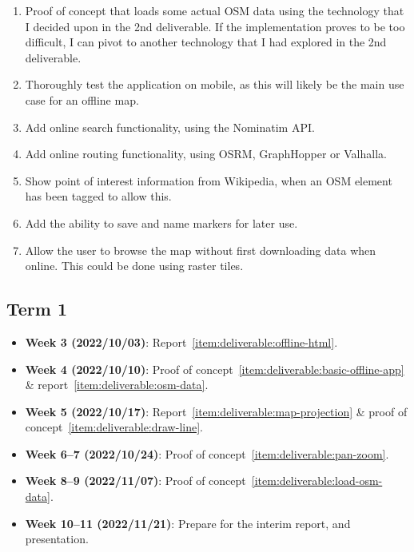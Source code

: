 \documentclass[]{final_report}
\begin{document}
\begin{enumerate}
    \item Proof of concept that loads some actual OSM data using the technology that I decided upon in the 2nd deliverable. If the implementation proves to be too difficult, I can pivot to another technology that I had explored in the 2nd deliverable.\label{item:deliverable:load-osm-data}
    \item Thoroughly test the application on mobile, as this will likely be the main use case for an offline map.\label{item:deliverable:mobile-testing}
    \item Add online search functionality, using the Nominatim API.\label{item:deliverable:search}
    \item Add online routing functionality, using OSRM, GraphHopper or Valhalla.\label{item:deliverable:routing}
    \item Show point of interest information from Wikipedia, when an OSM element has been tagged to allow this.\label{item:deliverable:wikipedia}
    \item Add the ability to save and name markers for later use.\label{item:deliverable:markers}
    \item Allow the user to browse the map without first downloading data when online. This could be done using raster tiles.\label{item:deliverable:online}
\end{enumerate}

\subsection{Term 1}

\begin{itemize}
    \item \textbf{Week 3 (2022/10/03)}: Report~\ref{item:deliverable:offline-html}.
    \item \textbf{Week 4 (2022/10/10)}: Proof of concept~\ref{item:deliverable:basic-offline-app} \& report~\ref{item:deliverable:osm-data}.
    \item \textbf{Week 5 (2022/10/17)}: Report~\ref{item:deliverable:map-projection} \& proof of concept~\ref{item:deliverable:draw-line}.
    \item \textbf{Week 6--7 (2022/10/24)}: Proof of concept~\ref{item:deliverable:pan-zoom}.
    \item \textbf{Week 8--9 (2022/11/07)}: Proof of concept~\ref{item:deliverable:load-osm-data}.
    \item \textbf{Week 10--11 (2022/11/21)}: Prepare for the interim report, and presentation.
\end{itemize}
\end{document}
